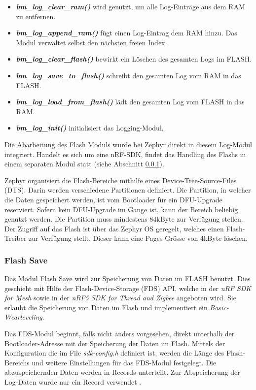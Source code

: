\begin{itemize}
	\item \textit{\textbf{bm\_log\_clear\_ram()}} wird genutzt, um alle Log-Einträge aus dem RAM zu entfernen.
	\item \textit{\textbf{bm\_log\_append\_ram()}} fügt einen Log-Eintrag dem RAM hinzu. Das Modul verwaltet selbst den nächsten freien Index. 
	\item \textit{\textbf{bm\_log\_clear\_flash()}} bewirkt ein Löschen des gesamten Logs im FLASH. 
	\item \textit{\textbf{bm\_log\_save\_to\_flash()}} schreibt den gesamten Log vom RAM in das FLASH. 
	\item \textit{\textbf{bm\_log\_load\_from\_flash()}} lädt den gesamten Log vom FLASH in das RAM. 
	\item \textit{\textbf{bm\_log\_init()}} initialisiert das Logging-Modul.
\end{itemize} 

Die Abarbeitung des Flash Moduls wurde bei Zephyr direkt in diesem Log-Modul integriert.
Handelt es sich um eine nRF-SDK, findet das Handling des Flashs in einem separaten Modul statt (siehe Abschnitt \ref{subsubsec:FlashSave}).

Zephyr organisiert die Flash-Bereiche mithilfe eines Device-Tree-Source-Files (DTS).
Darin werden verschiedene Partitionen definiert.
Die Partition, in welcher die Daten gespeichert werden, ist vom Bootloader für ein DFU-Upgrade reserviert.
Sofern kein DFU-Upgrade im Gange ist, kann der Bereich beliebig genutzt werden. Die Partition muss mindestens 84kByte zur Verfügung stellen.
Der Zugriff auf das Flash ist über das Zephyr OS geregelt, welches einen Flash-Treiber zur Verfügung stellt.
Dieser kann eine Pages-Grösse von 4kByte löschen. 


\subsubsection{Flash Save}\label{subsubsec:FlashSave}
Das Modul Flash Save wird zur Speicherung von Daten im FLASH benutzt.
Dies geschieht mit Hilfe der Flash-Device-Storage (FDS) API, welche in der \textit{nRF SDK for Mesh} sowie in der \textit{nRF5 SDK for Thread and Zigbee} angeboten wird.
Sie erlaubt die Speicherung von Daten im Flash und implementiert ein \textit{Basic-Wearleveling}.

Das FDS-Modul beginnt, falls nicht anders vorgesehen, direkt unterhalb der Bootloader-Adresse mit der Speicherung der Daten im Flash.
Mittels der Konfiguration die im File \textit{sdk-config.h} definiert ist, werden die Länge des Flash-Bereichs und weitere Einstellungen für das FDS-Modul festgelegt.
Die abzuspeichernden Daten werden in Records unterteilt.
Zur Abspeicherung der Log-Daten wurde nur ein Record verwendet \cite{nordic_semi_nrf5_sdk_flash_data_storage_2020}.




